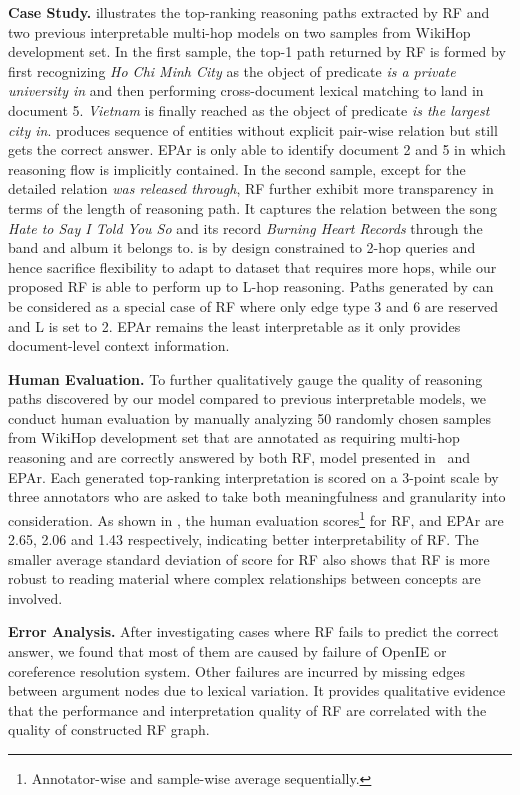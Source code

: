 \noindent
\textbf{Case Study. }  illustrates the top-ranking reasoning paths extracted by RF and two previous interpretable multi-hop models on two samples from WikiHop development set. In the first sample, the top-1 path returned by RF is formed by first recognizing \textit{Ho Chi Minh City} as the object of predicate \textit{is a private university in} and then performing cross-document lexical matching to land in document 5. \textit{Vietnam} is finally reached as the object of predicate \textit{is the largest city in}. \citet{Kundu2019} produces sequence of entities without explicit pair-wise relation but still gets the correct answer. EPAr is only able to identify document 2 and 5 in which reasoning flow is implicitly contained. In the second sample, except for the detailed relation \textit{was released through}, RF further exhibit more transparency in terms of the length of reasoning path. It captures the relation between the song \textit{Hate to Say I Told You So} and its record \textit{Burning Heart Records} through the band and album it belongs to. \citet{Kundu2019} is by design constrained to 2-hop queries and hence sacrifice flexibility to adapt to dataset that requires more hops, while our proposed RF is able to perform up to L-hop reasoning. Paths generated by \cite{Kundu2019} can be considered as a special case of RF where only edge type 3 and 6 are reserved and L is set to 2. EPAr remains the least interpretable as it only provides document-level context information.

\noindent
\textbf{Human Evaluation. } To further qualitatively gauge the quality of reasoning paths discovered by our model compared to previous interpretable models, we conduct human evaluation by manually analyzing 50 randomly chosen samples from WikiHop development set that are annotated as requiring multi-hop reasoning and are correctly answered by both RF, model presented in~\cite{Kundu2019} and EPAr. Each generated top-ranking interpretation is scored on a 3-point scale by three annotators who are asked to take both meaningfulness and granularity into consideration. As shown in , the human evaluation scores\footnote{Annotator-wise and sample-wise average sequentially.} for RF, \cite{Kundu2019} and EPAr are 2.65, 2.06 and 1.43 respectively, indicating better interpretability of RF. The smaller average standard deviation of score for RF also shows that RF is more robust to reading material where complex relationships between concepts are involved.

\noindent
\textbf{Error Analysis. } After investigating cases where RF fails to predict the correct answer, we found that most of them are caused by failure of OpenIE or coreference resolution system. Other failures are incurred by missing edges between argument nodes due to lexical variation. It provides qualitative evidence that the performance and interpretation quality of RF are correlated with the quality of constructed RF graph.

